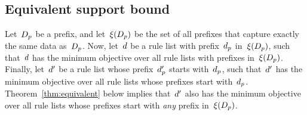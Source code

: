 \begin{arxiv}

\end{arxiv}

\subsection{Equivalent support bound}
\label{sec:equivalent}

Let~$D_p$ be a prefix, and let~$\xi(D_p)$ be the set
of all prefixes that capture exactly the same data as~$D_p$.
%
Now, let~${d}$ be a rule list with prefix~$d_p$
in~$\xi(D_p)$, such that~${d}$ has the minimum objective
over all rule lists with prefixes in~$\xi(D_p)$.
%
Finally, let~${d}'$ be a rule list whose prefix~$d_p'$
starts with~$d_p$, such that~${d}'$ has the minimum objective
over all rule lists whose prefixes start with~$d_p$.
%
Theorem~\ref{thm:equivalent} below implies that~${d}'$ also has
the minimum objective over all rule lists whose prefixes start with
\emph{any} prefix in~$\xi(D_p)$.

